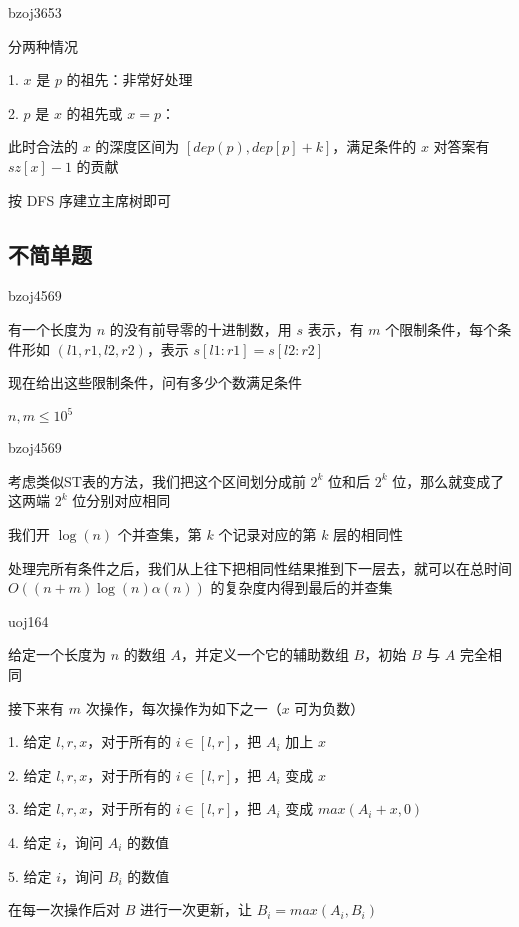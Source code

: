\documentclass[UTF8]{beamer}
\begin{document}
			\begin{frame}{bzoj3653}

			分两种情况

			1. $x$ 是 $p$ 的祖先：非常好处理

			2. $p$ 是 $x$ 的祖先或 $x=p$：

			此时合法的 $x$ 的深度区间为 $[dep(p),dep[p]+k]$，满足条件的 $x$ 对答案有 $sz[x]-1$ 的贡献

			按 DFS 序建立主席树即可

			\end{frame}

		\subsection{不简单题}

			\begin{frame}{bzoj4569}

			有一个长度为 $n$ 的没有前导零的十进制数，用 $s$ 表示，有 $m$ 个限制条件，每个条件形如 $(l1,r1,l2,r2)$，表示 $s[l1:r1]=s[l2:r2]$

			现在给出这些限制条件，问有多少个数满足条件

			$n,m \le 10^5$

			\end{frame}

			\begin{frame}{bzoj4569}

			考虑类似ST表的方法，我们把这个区间划分成前 $2^k$ 位和后 $2^k$ 位，那么就变成了这两端 $2^k$ 位分别对应相同

			我们开 $\log(n)$ 个并查集，第 $k$ 个记录对应的第 $k$ 层的相同性

			处理完所有条件之后，我们从上往下把相同性结果推到下一层去，就可以在总时间 $O((n+m)\log(n)\alpha(n))$ 的复杂度内得到最后的并查集

			\end{frame}

			\begin{frame}{uoj164}

			给定一个长度为 $n$ 的数组 $A$，并定义一个它的辅助数组 $B$，初始 $B$ 与 $A$ 完全相同

			接下来有 $m$ 次操作，每次操作为如下之一（$x$ 可为负数）

			1. 给定 $l,r,x$，对于所有的 $i \in [l,r]$，把 $A_i$ 加上 $x$

			2. 给定 $l,r,x$，对于所有的 $i \in [l,r]$，把 $A_i$ 变成 $x$

			3. 给定 $l,r,x$，对于所有的 $i \in [l,r]$，把 $A_i$ 变成 $max(A_i+x,0)$

			4. 给定 $i$，询问 $A_i$ 的数值

			5. 给定 $i$，询问 $B_i$ 的数值

			在每一次操作后对 $B$ 进行一次更新，让 $B_i=max(A_i,B_i)$

			\end{frame}
\end{document}
